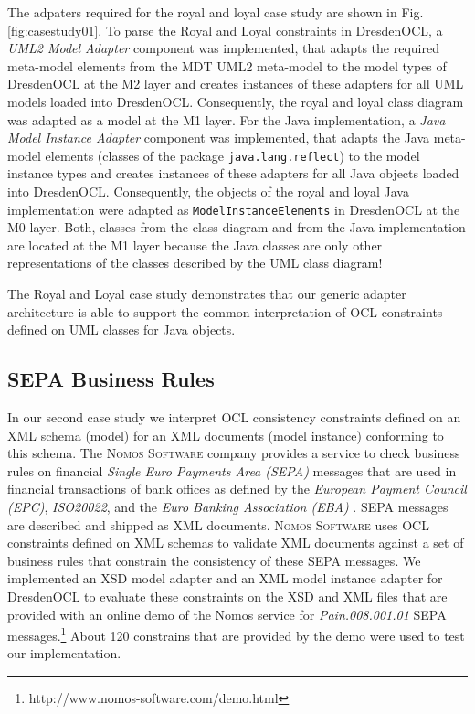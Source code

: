 The adpaters required for the royal and loyal case study are shown in Fig.
\ref{fig:casestudy01}. To parse the Royal and Loyal constraints
in DresdenOCL, a \textit{UML2 Model Adapter} component was implemented, that 
adapts the required meta-model elements from the MDT UML2 meta-model to the model 
types of DresdenOCL at the M2 layer and creates instances of these adapters for all UML models 
loaded into DresdenOCL. 
Consequently, the royal and loyal class diagram was adapted as a model at the M1 layer.
 For the Java implementation, a \textit{Java Model Instance Adapter} component was implemented,
that adapts the Java meta-model elements (classes of the package \texttt{java.lang.reflect})
to the model instance types and creates instances of these adapters for all Java objects
loaded into DresdenOCL. Consequently, the objects of the royal and loyal Java implementation
were adapted as \texttt{ModelInstanceElements} in DresdenOCL at the M0 layer. Both, classes from 
the class diagram and from the Java implementation are located at the M1 layer 
because the Java classes are only other representations of the classes described by the 
UML class diagram! 

The Royal and Loyal case study demonstrates that our generic adapter architecture is able to 
support the common interpretation of OCL constraints defined on UML classes for Java objects.


\subsection{SEPA Business Rules}

In our second case study we interpret OCL consistency constraints
defined on an XML schema (model) for an XML documents (model instance)
conforming to this schema. The \textsc{Nomos Software} company provides a
service to check business rules on financial \textit{Single Euro Payments Area (SEPA)} messages that are 
used in financial transactions of bank offices as defined by the \textit{European
Payment Council (EPC)}, \textit{ISO20022}, and the \textit{Euro Banking Association (EBA)} \cite{spec:UNIFI,spec:EPC,WWW:EBA}. 
SEPA messages are described and shipped as XML documents.
\textsc{Nomos Software} uses OCL constraints defined on XML schemas
to validate XML documents against a set of business rules that constrain the consistency of
these SEPA messages. We implemented an XSD model adapter and an XML model
instance adapter for DresdenOCL to evaluate these constraints on the XSD and
XML files that are provided with an online demo of the Nomos service for \textit{Pain.008.001.01} 
SEPA messages.\footnote{http://www.nomos-software.com/demo.html}
About 120 constrains that are provided by the demo were used to test our
implementation.

